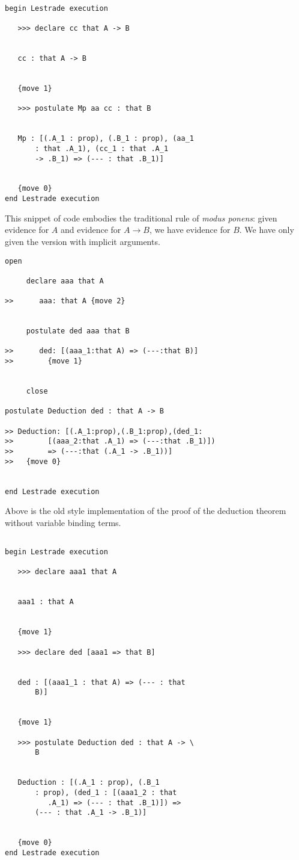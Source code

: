 \documentclass[12pt]{article}
\begin{document}
\begin{verbatim}

begin Lestrade execution

   >>> declare cc that A -> B


   cc : that A -> B


   {move 1}

   >>> postulate Mp aa cc : that B


   Mp : [(.A_1 : prop), (.B_1 : prop), (aa_1 
       : that .A_1), (cc_1 : that .A_1 
       -> .B_1) => (--- : that .B_1)]


   {move 0}
end Lestrade execution
\end{verbatim}

This snippet of code embodies the traditional rule of {\em modus ponens}:  given evidence for $A$ and evidence for $A \rightarrow B$, we have evidence for $B$.  We have only given the version with implicit arguments. 

    \begin{verbatim}
open

     declare aaa that A

>>      aaa: that A {move 2}


     postulate ded aaa that B

>>      ded: [(aaa_1:that A) => (---:that B)]
>>        {move 1}


     close

postulate Deduction ded : that A -> B

>> Deduction: [(.A_1:prop),(.B_1:prop),(ded_1:
>>        [(aaa_2:that .A_1) => (---:that .B_1)])
>>        => (---:that (.A_1 -> .B_1))]
>>   {move 0}


end Lestrade execution
\end{verbatim}

Above is the old style implementation of the proof of the deduction theorem without variable binding terms.

\begin{verbatim}

begin Lestrade execution

   >>> declare aaa1 that A


   aaa1 : that A


   {move 1}

   >>> declare ded [aaa1 => that B]


   ded : [(aaa1_1 : that A) => (--- : that 
       B)]


   {move 1}

   >>> postulate Deduction ded : that A -> \
       B


   Deduction : [(.A_1 : prop), (.B_1 
       : prop), (ded_1 : [(aaa1_2 : that 
          .A_1) => (--- : that .B_1)]) => 
       (--- : that .A_1 -> .B_1)]


   {move 0}
end Lestrade execution
\end{verbatim}
\end{document}
